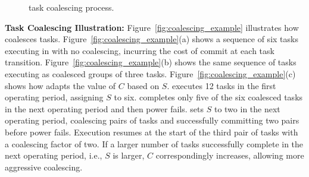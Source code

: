 \begin{figure}
	\centering
	\caption{\sys task coalescing process.}
	\label{ffig:coalescing_example}
\end{figure}

\noindent\textbf{Task Coalescing Illustration:} Figure~\ref{fig:coalescing_example} illustrates how \sys coalesces tasks. Figure~\ref{fig:coalescing_example}(a) shows a sequence of six tasks executing in \sys with no coalescing, incurring the cost of commit at each task transition. Figure~\ref{fig:coalescing_example}(b) shows the same sequence of tasks executing as coalesced groups of three tasks. Figure~\ref{fig:coalescing_example}(c) shows how \sys adapts the value of $C$ based on $S$. \sys executes 12 tasks in the first operating period, assigning $S$ to six. \sys completes only five of the six coalesced tasks in the next operating period and then power fails. \sys sets $S$ to two in the next operating period, coalescing pairs of tasks and successfully committing two pairs before power fails. Execution resumes at the start of the third pair of tasks with a coalescing factor of two. If a larger number of tasks successfully complete in the next operating period, i.e., $S$ is larger, $C$ correspondingly increases, allowing more aggressive coalescing.

